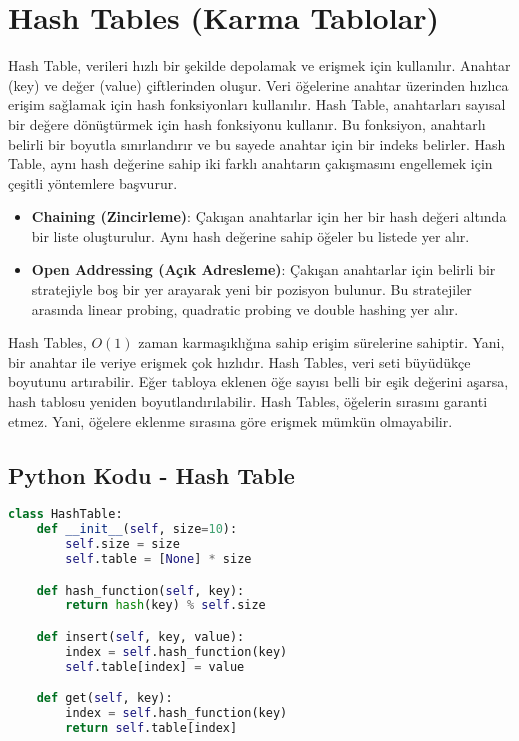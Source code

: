 \section{Hash Tables (Karma Tablolar)}

Hash Table, verileri hızlı bir şekilde depolamak ve erişmek için kullanılır. Anahtar (key) ve değer (value) çiftlerinden oluşur. Veri öğelerine anahtar üzerinden hızlıca erişim sağlamak için hash fonksiyonları kullanılır. Hash Table, anahtarları sayısal bir değere dönüştürmek için hash fonksiyonu kullanır. Bu fonksiyon, anahtarlı belirli bir boyutla sınırlandırır ve bu sayede anahtar için bir indeks belirler. Hash Table, aynı hash değerine sahip iki farklı anahtarın çakışmasını engellemek için çeşitli yöntemlere başvurur.

\begin{itemize}
    \item \textbf{Chaining (Zincirleme)}: Çakışan anahtarlar için her bir hash değeri altında bir liste oluşturulur. Aynı hash değerine sahip öğeler bu listede yer alır.
    \item \textbf{Open Addressing (Açık Adresleme)}: Çakışan anahtarlar için belirli bir stratejiyle boş bir yer arayarak yeni bir pozisyon bulunur. Bu stratejiler arasında linear probing, quadratic probing ve double hashing yer alır.
\end{itemize}

Hash Tables, $O(1)$ zaman karmaşıklığına sahip erişim sürelerine sahiptir. Yani, bir anahtar ile veriye erişmek çok hızlıdır. Hash Tables, veri seti büyüdükçe boyutunu artırabilir. Eğer tabloya eklenen öğe sayısı belli bir eşik değerini aşarsa, hash tablosu yeniden boyutlandırılabilir. Hash Tables, öğelerin sırasını garanti etmez. Yani, öğelere eklenme sırasına göre erişmek mümkün olmayabilir.

\subsection{Python Kodu - Hash Table}

\begin{lstlisting}[language=Python]
class HashTable:
    def __init__(self, size=10):
        self.size = size
        self.table = [None] * size

    def hash_function(self, key):
        return hash(key) % self.size

    def insert(self, key, value):
        index = self.hash_function(key)
        self.table[index] = value

    def get(self, key):
        index = self.hash_function(key)
        return self.table[index]
\end{lstlisting}

\newpage